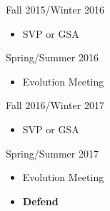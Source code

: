 \documentclass[12pt,letterpaper]{article}
\begin{document}
Fall 2015/Winter 2016
\begin{itemize}
  \item SVP or GSA
\end{itemize}

Spring/Summer 2016
\begin{itemize}
  \item Evolution Meeting
\end{itemize}

Fall 2016/Winter 2017
\begin{itemize}
  \item SVP or GSA
\end{itemize}

Spring/Summer 2017
\begin{itemize}
  \item Evolution Meeting
  \item \textbf{Defend}
\end{itemize}



\clearpage


\end{document}
